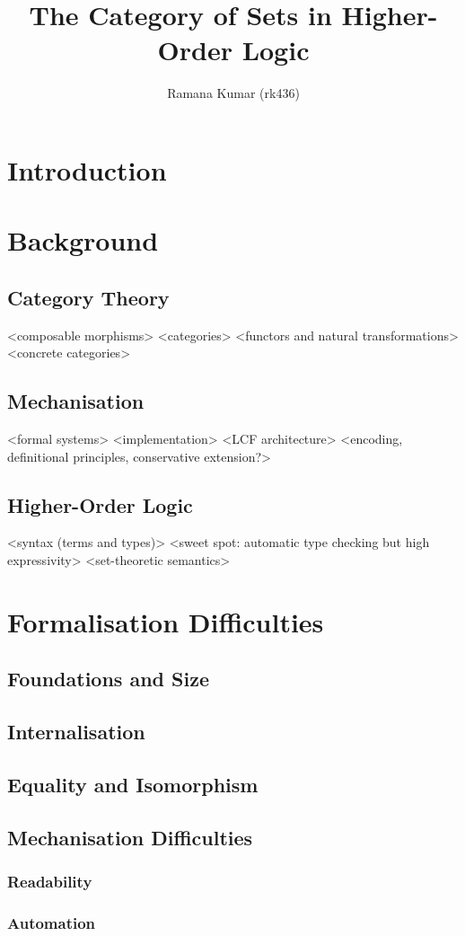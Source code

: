 \documentclass{article}
\title{The Category of Sets in Higher-Order Logic}
\author{Ramana Kumar (rk436)}
\begin{document}
\maketitle
\section{Introduction}
\section{Background}
\subsection{Category Theory}
<composable morphisms>
<categories>
<functors and natural transformations>
<concrete categories>
\subsection{Mechanisation}
<formal systems>
<implementation>
<LCF architecture>
<encoding, definitional principles, conservative extension?>
\subsection{Higher-Order Logic}
<syntax (terms and types)>
<sweet spot: automatic type checking but high expressivity>
<set-theoretic semantics>
\section{Formalisation Difficulties}
\subsection{Foundations and Size}
\subsection{Internalisation}
\subsection{Equality and Isomorphism}
\subsection{Mechanisation Difficulties}
\subsubsection{Readability}
\subsubsection{Automation}
\end{document}
